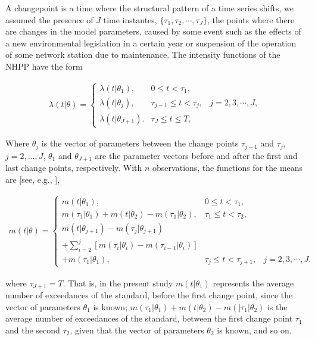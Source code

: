 \documentclass[APA,STIX1COL]{WileyNJD-v2}
\begin{document}
A changepoint is a time where the structural pattern of a time series shifts, we assumed the presence of $J$ time instantes, $\{\tau_1, \tau_2, \cdots ,\tau_J\}$, the points where there are changes in the model parameters, caused by some event such as the effects of a new environmental legislation in a certain year or suspension of the operation of some network station due to maintenance. The intensity functions of the NHPP have the form


\begin{eqnarray}
	\label{eq3}
\lambda(t | \theta) = 
\left\lbrace
\begin{array}{lll}
	\lambda(t|\theta_1), & 0\leq t< \tau_1, &\\
	\lambda(t|\theta_j), & \tau_{j-1}\leq t<\tau_j, & j = 2,3,\cdots,J,\\
	\lambda(t|\theta_{J+1}). &\tau_J\leq t\leq T,  &
\end{array}
\right.
\end{eqnarray}


Where $\theta_j$ is the vector of parameters between the change points $\tau_{j-1}$ and $\tau_j$, $j=2,...,J$, $\theta_1$ and $\theta_{J+1}$ are the parameter vectors before and after the first and last change points, respectively.
With $n$ observations, the functions for the means are [see, e.g., \cite{Rodrigues13}],


\begin{eqnarray}
	\label{eq4}
m(t|\theta) = 
\left\lbrace
\begin{array}{lll}
	m(t|\theta_1), & 0\leq t< \tau_1, &\\
	m(\tau_1|\theta_1) + m(t|\theta_2) - m(\tau_1|\theta_2), & \tau_1\leq t<\tau_2, \\
	m(t|\theta_{j+1}) - m(\tau_j|\theta_{j+1}) \\+ \sum_{i=2}^{j}[m(\tau_i|\theta_i) - m(\tau_{i-1}|\theta_i)] \\+ m(\tau_1|\theta_1),  & \tau_{j}\leq t<\tau_{j+1}, & j = 2,3,\cdots,J.
\end{array}
\right.
\end{eqnarray}


where $\tau_{J+1}=T$. That is, in the present study $m(t|\theta_1)$ represents the average number of exceedances of the standard, before the first change point, since the vector of parameters $\theta_1$ is known;  $m(\tau_1|\theta_1) + m(t|\theta_2)-m(|\tau_1|\theta_2)$ is the average number of exceedances of the standard, between the first change point $\tau_1$ and the second $\tau_2$, given that the vector of parameters $\theta_2$ is known, and so on. \\
\end{document}
